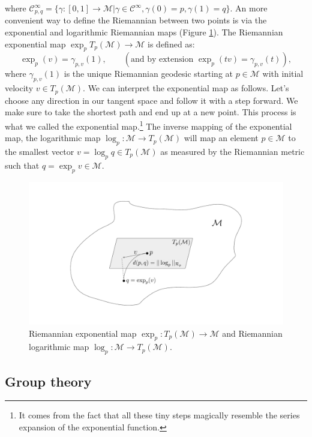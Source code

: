 \documentclass{article}
\begin{document}
where $\mathcal{C}^\infty_{p, q} = \{ \gamma : [0, 1] \to \mathcal{M} | \gamma \in \mathcal{C}^\infty, \gamma(0) = p,  \gamma(1) = q\}$. An more convenient way to define the Riemannian between two points is via the exponential and logarithmic Riemannian maps (Figure \ref{fig:explogmap}). The Riemannian exponential map $\exp_p T_p(\mathcal{M}) \to \mathcal{M}$ is defined as:
\begin{equation}
\exp_p (v) = \gamma_{p, v}(1) ,\qquad (\text{and by extension } \exp_p (tv) = \gamma_{p, v}(t)),
\end{equation}
where $\gamma_{p,v}(1)$ is the unique Riemannian geodesic starting at $p \in \mathcal{M}$ with initial velocity $v \in T_p(\mathcal{M})$. We can interpret the exponential map as follows. Let’s choose any direction in our tangent space and follow it with a step forward. We make sure to take the shortest path and end up at a new point. This process is what we called the exponential map.\footnote{It comes from the fact that all these tiny steps magically resemble the series expansion of the exponential function.} The inverse mapping of the exponential map, the logarithmic map $\log_p : \mathcal{M} \to T_p(\mathcal{M})$ will map an element $p \in \mathcal{M}$ to the smallest vector $v = \log_p q \in T_p(\mathcal{M})$ as measured by the Riemannian metric such that $q = \exp_p v \in \mathcal{M}$. 

\begin{figure}[h!]
    \centering
    \includegraphics[width=\textwidth]{Images/distexplog.pdf}
    \caption{Riemannian exponential map $\exp_p : T_p(\mathcal{M}) \to \mathcal{M}$ and Riemannian logarithmic map $\log_p : \mathcal{M} \to T_p(\mathcal{M})$.}
    \label{fig:explogmap}
\end{figure}


\subsection{Group theory}
\end{document}
